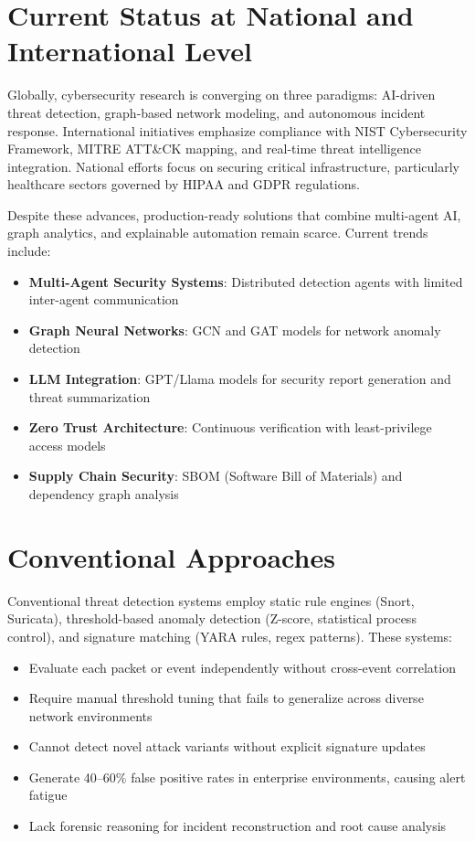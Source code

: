 \documentclass[12pt, a4paper]{report}
\begin{document}
\section{Current Status at National and International Level}

Globally, cybersecurity research is converging on three paradigms: AI-driven threat detection, graph-based network modeling, and autonomous incident response. International initiatives emphasize compliance with NIST Cybersecurity Framework, MITRE ATT\&CK mapping, and real-time threat intelligence integration. National efforts focus on securing critical infrastructure, particularly healthcare sectors governed by HIPAA and GDPR regulations.

Despite these advances, production-ready solutions that combine multi-agent AI, graph analytics, and explainable automation remain scarce. Current trends include:

\begin{itemize}
    \item \textbf{Multi-Agent Security Systems}: Distributed detection agents with limited inter-agent communication
    \item \textbf{Graph Neural Networks}: GCN and GAT models for network anomaly detection
    \item \textbf{LLM Integration}: GPT/Llama models for security report generation and threat summarization
    \item \textbf{Zero Trust Architecture}: Continuous verification with least-privilege access models
    \item \textbf{Supply Chain Security}: SBOM (Software Bill of Materials) and dependency graph analysis
\end{itemize}

\section{Conventional Approaches}

Conventional threat detection systems employ static rule engines (Snort, Suricata), threshold-based anomaly detection (Z-score, statistical process control), and signature matching (YARA rules, regex patterns). These systems:

\begin{itemize}
    \item Evaluate each packet or event independently without cross-event correlation
    \item Require manual threshold tuning that fails to generalize across diverse network environments
    \item Cannot detect novel attack variants without explicit signature updates
    \item Generate 40--60\% false positive rates in enterprise environments, causing alert fatigue
    \item Lack forensic reasoning for incident reconstruction and root cause analysis
\end{itemize}
\end{document}
